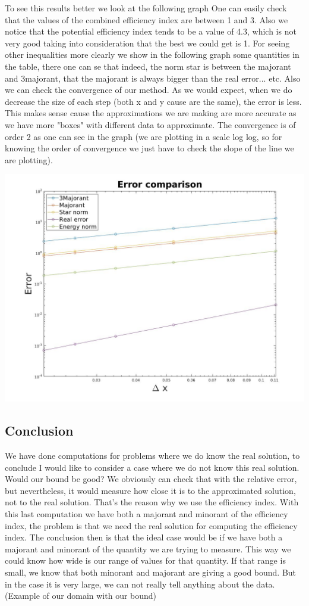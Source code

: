 \documentclass{article}
\begin{document}
	To see this results better we look at the following graph
	One can easily check that the values of the combined efficiency index are between 1 and 3. Also we notice that the potential efficiency index tends to be a value of 4.3, which is not very good taking into consideration that the best we could get is 1. 
	For seeing other inequalities more clearly we show in the following graph some quantities in the table, there one can se that indeed, the norm star is between the majorant and 3majorant, that the majorant is always bigger than the real error... etc. Also we can check the convergence of our method. As we would expect, when we do decrease the size of each step (both x and y cause are the same), the error is less. This makes sense cause the approximations we are making are more accurate as we have more "boxes" with different data to approximate. The convergence is of order 2 as one can see in the graph (we are plotting in a scale log log, so for knowing the order of convergence we just have to check the slope of the line we are plotting). 
	\begin{center}
		\includegraphics[width = 0.7\linewidth]{../Images/errorcomparison2d.jpg}
	\end{center}
	
	
	
	\subsection*{Conclusion}
	We have done computations for problems where we do know the real solution, to conclude I would like to consider a case where we do not know this real solution. Would our bound be good? We obviously can check that with the relative error, but nevertheless, it would measure how close it is to the approximated solution, not to the real solution. That's the reason why we use the efficiency index. With this last computation we have both a majorant and minorant of the efficiency index, the problem is that we need the real solution for computing the efficiency index. The conclusion then is that the ideal case would be if we have both a majorant and minorant of the quantity we are trying to measure. This way we could know how wide is our range of values for that quantity. If that range is small, we know that both minorant and majorant are giving a good bound. But in the case it is very large, we can not really tell anything about the data. (Example of our domain with our bound)
	
	
\end{document}
